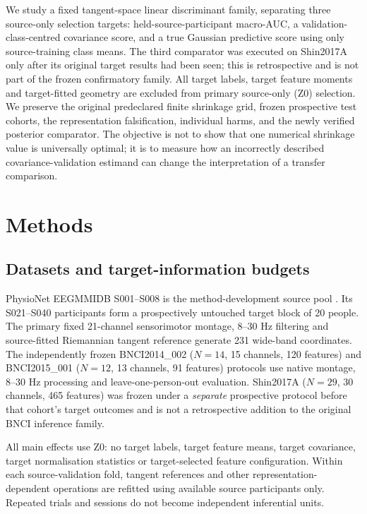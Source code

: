 \documentclass[11pt,a4paper]{article}
\begin{document}
We study a fixed tangent-space linear discriminant family, separating
three source-only selection targets: held-source-participant
macro-AUC, a validation-class-centred covariance score, and a true
Gaussian predictive score using only source-training class means.
The third comparator was executed on Shin2017A only after its original
target results had been seen; this is retrospective and is not part of
the frozen confirmatory family. All target labels, target feature
moments and target-fitted geometry are excluded from primary source-only
(Z0) selection. We preserve the original predeclared finite shrinkage grid,
frozen prospective test cohorts, the representation falsification,
individual harms, and the newly verified posterior comparator. The objective is not to show
that one numerical shrinkage value is universally optimal; it is to measure
how an incorrectly described covariance-validation estimand can change
the interpretation of a transfer comparison.



\section{Methods}
\subsection{Datasets and target-information budgets}
PhysioNet EEGMMIDB S001--S008 is the method-development source pool
\cite{schalk2009eegmmidb,schalk2004bci2000}.
Its S021--S040 participants form a prospectively untouched target block
of 20 people. The primary fixed 21-channel sensorimotor montage, 8--30 Hz
filtering and source-fitted Riemannian tangent reference generate 231
wide-band coordinates. The independently frozen BNCI2014\_002
(\(N=14\), 15 channels, 120 features) and BNCI2015\_001
(\(N=12\), 13 channels, 91 features) protocols use native montage,
8--30 Hz processing and leave-one-person-out evaluation. Shin2017A
(\(N=29\), 30 channels, 465 features) was frozen under a \emph{separate}
prospective protocol before that cohort's target outcomes and is not a
retrospective addition to the original BNCI inference family.

All main effects use Z0: no target labels, target feature means, target
covariance, target normalisation statistics or target-selected feature
configuration. Within each source-validation fold, tangent references and
other representation-dependent operations are refitted using available
source participants only. Repeated trials and sessions do not become
independent inferential units.
\end{document}
